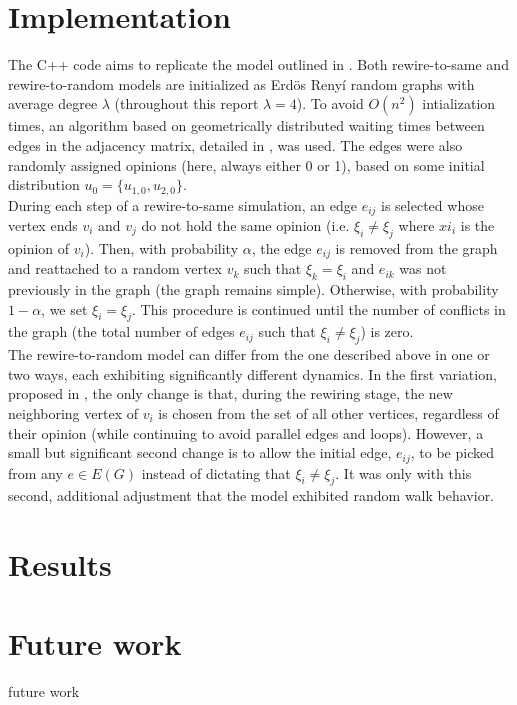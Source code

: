 \documentclass[11pt]{article}
\begin{document}
\section*{Implementation}
The C++ code aims to replicate the model outlined in \cite{durret:pnas12}. Both rewire-to-same and rewire-to-random models are initialized as Erd\"{o}s Reny\'{i} random graphs with average degree $\lambda$ (throughout this report $\lambda = 4$). To avoid $O(n^{2})$ intialization times, an algorithm based on geometrically distributed waiting times between edges in the adjacency matrix, detailed in \cite{?}, was used. The edges were also randomly assigned opinions (here, always either 0 or 1), based on some initial distribution $u_{0}=\{u_{1,0},u_{2,0}\}$.
\\During each step of a rewire-to-same simulation, an edge $e_{ij}$ is selected whose vertex ends $v_{i}$ and $v_{j}$ do not hold the same opinion (i.e. $\xi_{i}\neq\xi_{j}$ where $xi_{i}$ is the opinion of $v_{i}$). Then, with probability $\alpha$, the edge $e_{ij}$ is removed from the graph and reattached to a random vertex $v_{k}$ such that $\xi_{k}=\xi_{i}$ and $e_{ik}$ was not previously in the graph (the graph remains simple). Otherwise, with probability $1-\alpha$, we set $\xi_{i}=\xi_{j}$. This procedure is continued until the number of conflicts in the graph (the total number of edges $e_{ij}$ such that $\xi_{i}\neq\xi_{j}$) is zero.
\\The rewire-to-random model can differ from the one described above in one or two ways, each exhibiting significantly different dynamics. In the first variation, proposed in \cite{durret:pnas12}, the only change is that, during the rewiring stage, the new neighboring vertex of $v_{i}$ is chosen from the set of all other vertices, regardless of their opinion (while continuing to avoid parallel edges and loops). However, a small but significant second change is to allow the initial edge, $e_{ij}$, to be picked from any $e\in E(G)$ instead of dictating that $\xi_{i}\neq\xi_{j}$.  It was only with this second, additional adjustment that the model exhibited random walk behavior.
\section*{Results}

\section*{Future work}
future work


\end{document}
